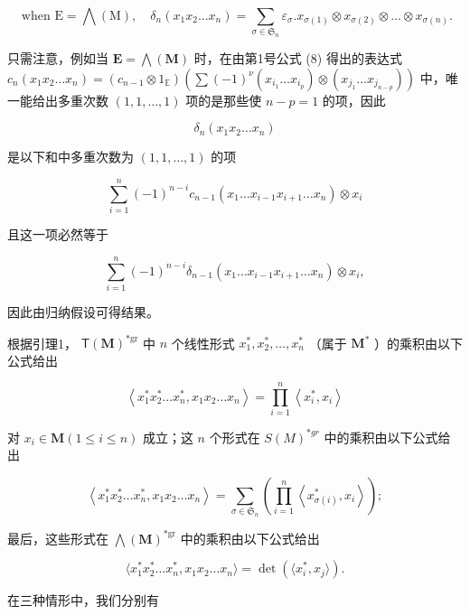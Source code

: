 \[
\text { when } \mathrm{E} = \bigwedge (\mathrm{M}), \quad \delta_ {n} (x _ {1} x _ {2} \dots x _ {n}) = \sum_ {\sigma \in \mathfrak {S} _ {n}} \varepsilon_ {\sigma}. x _ {\sigma (1)} \otimes x _ {\sigma (2)} \otimes \dots \otimes x _ {\sigma (n)}.
\]

只需注意，例如当 \(\mathbf{E} = \bigwedge (\mathbf{M})\) 时，在由第1号公式 (8) 得出的表达式 \(c_{n}(x_{1}x_{2}\ldots x_{n}) = (c_{n - 1}\otimes 1_{\mathbb{E}})\left(\sum (-1)^{\nu}(x_{i_1}\ldots x_{i_p})\otimes (x_{j_1}\ldots x_{j_{n - p}})\right)\) 中，唯一能给出多重次数 \((1,1,\dots ,1)\) 项的是那些使 \(n - p = 1\) 的项，因此

\[
\delta_ {n} (x _ {1} x _ {2} \dots x _ {n})
\]

是以下和中多重次数为 \((1, 1, \ldots, 1)\) 的项

\[
\sum_ {i = 1} ^ {n} (- 1) ^ {n - i} c _ {n - 1} \left(x _ {1} \dots x _ {i - 1} x _ {i + 1} \dots x _ {n}\right) \otimes x _ {i}
\]

且这一项必然等于

\[
\sum_ {i = 1} ^ {n} (- 1) ^ {n - i} \delta_ {n - 1} (x _ {1} \dots x _ {i - 1} x _ {i + 1} \dots x _ {n}) \otimes x _ {i},
\]

因此由归纳假设可得结果。

根据引理1， \(\mathsf{T}(\mathbf{M})^{*\mathrm{gr}}\) 中 \(n\) 个线性形式 \(x_{1}^{*}, x_{2}^{*}, \ldots, x_{n}^{*}\) （属于 \(\mathbf{M}^{*}\) ）的乘积由以下公式给出

\[
\left\langle x _ {1} ^ {*} x _ {2} ^ {*} \dots x _ {n} ^ {*}, x _ {1} x _ {2} \dots x _ {n} \right\rangle = \prod_ {i = 1} ^ {n} \left\langle x _ {i} ^ {*}, x _ {i} \right\rangle\tag{28}
\]

对 \(x_{i} \in \mathbf{M} (1 \leqslant i \leqslant n)\) 成立；这 \(n\) 个形式在 \(S(M)^{*gr}\) 中的乘积由以下公式给出

\[
\left\langle x _ {1} ^ {*} x _ {2} ^ {*} \dots x _ {n} ^ {*}, x _ {1} x _ {2} \dots x _ {n} \right\rangle = \sum_ {\sigma \in \mathfrak {S} _ {n}} \left(\prod_ {i = 1} ^ {n} \left\langle x _ {\sigma (i)} ^ {*}, x _ {i} \right\rangle\right);\tag{29}
\]

最后，这些形式在 \(\bigwedge (\mathbf{M})^{*\mathrm{gr}}\) 中的乘积由以下公式给出

\[
\langle x _ {1} ^ {*} x _ {2} ^ {*} \dots x _ {n} ^ {*}, x _ {1} x _ {2} \dots x _ {n} \rangle = \det (\langle x _ {i} ^ {*}, x _ {j} \rangle).\tag{30}
\]

在三种情形中，我们分别有

